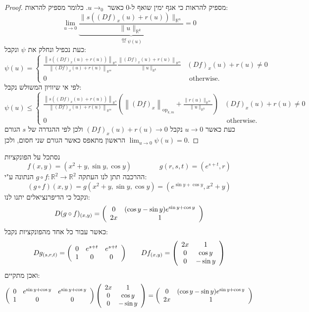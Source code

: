 \documentclass{tstextbook}
\begin{document}
\begin{proof}
מספיק להראות כי אגף ימין שואף ל-0 כאשר \(u\to_{0}\). כלומר מספיק להראות:
$$\operatorname*{lim}_{u\to0}\underbrace{\frac{\|s((D f)_{x}(u)+r(u))\|_{\mathbb{R}^{n}}}{\|u\|_{\mathbb{R}^{k}}}}_{\stackrel{\mathrm{def}}{=}\psi(u)}=0$$
כעת נכפיל ונחלק את \(\psi\) ונקבל:
$$\psi(u)= \begin{cases}\frac{\left\|s\left((D f)_x(u)+r(u)\right)\right\|_{\mathbb{R}^n}}{\left\|(D f)_x(u)+r(u)\right\|_{\mathbb{R}^m}} \frac{\left\|(D f)_x(u)+r(u)\right\|_{\mathbb{R}^m}}{\|u\|_{\mathbb{R}^k}} & (D f)_x(u)+r(u) \neq 0 \\ 0 & \text { otherwise. }\end{cases}$$
לפי אי שיוויון המשולש נקבל:
$$\psi(u) \leq \begin{cases}\frac{\left\|s\left((D f)_x(u)+r(u)\right)\right\|_{\mathbb{R}^n}}{\left\|(D f)_x(u)+r(u)\right\|_{\mathbb{R}^m}}\left(\left\|(D f)_x\right\|_{\mathrm{op}_{k, m}}+\frac{\|r(u)\|_{\mathbb{R}^m}}{\|u\|_{\mathbb{R}^k}}\right) & (D f)_x(u)+r(u) \neq 0 \\ 0 & \text { otherwise. }\end{cases}$$
כעת כאשר \(u\to 0\) נקבל \((Df)_{x}(u)+r(u)\to 0\) ולכן לפי ההגדרה של \(s\) הגורם הראשון מתאפס כאשר הגורם שני חסום, ולכן \(\lim_{ u \to 0 }\psi(u)=0\).

\end{proof}
\begin{example}
נסתכל על הפונקציות
$$f(x,y)=(x^{2}+y,\sin y,\cos y)\qquad\qquad g(r,s,t)=(e^{s+t},r)$$
ההרכבה תתן לנו העתקה \(g\circ f:\mathbb{R}^2\to\mathbb{R}^2\) הנתונה ע"י:
$$(g\circ f)(x,y)=g(x^{2}+y,\sin y,\cos y)=(e^{\sin y+\cos y},x^{2}+y)$$
ונקבל כי הדיפרנציאלים יתנו לנו:
$$D(g\circ f)_{(x,y)}=\left(\begin{array}{c c}{{0}}&{{(\cos y-\sin y)e^{\sin y+\cos y}}}\\ {{2x}}&{{1}}\end{array}\right)$$
כאשר עבור כל אחד מהפונקציות נקבל:
$$D g_{(s,r,t)}=\left(\begin{array}{c c c}{{0}}&{{e^{s+t}}}&{{e^{s+t}}}\\ {{1}}&{{0}}&{{0}}\end{array}\right)\qquad D f_{(x,y)}=\left(\begin{array}{c c}{{2x}}&{{1}}\\ {{0}}&{{\cos y}}\\ {{0}}&{{-\sin y}}\end{array}\right)$$
ואכן מתקיים:
$$\left(\begin{array}{c c c}{{0}}&{{e^{\sin y+\cos y}}}&{{e^{\sin y+\cos y}}}\\ {{1}}&{{0}}&{{0}}\end{array}\right)\left(\begin{array}{c c c}{{2x}}&{{1}}\\ {{0}}&{{\cos y}}\\ {{0}}&{{-\sin y}}\end{array}\right)=\left(\begin{array}{c c c}{{0}}&{{(\cos y-\sin y)e^{\sin y+\cos y}}}\\ {{2x}}&{{1}}\end{array}\right)$$

\end{example}
\end{document}
